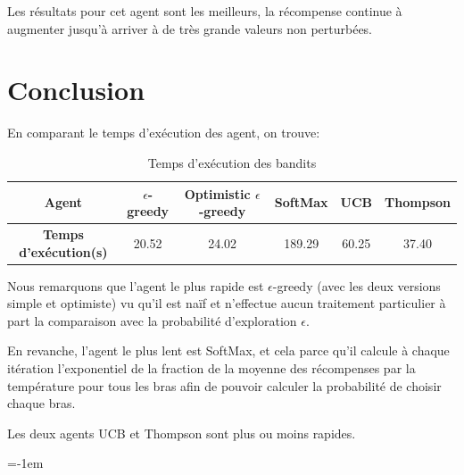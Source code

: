 \documentclass[a4paper,english,12pt]{article}
\makeatletter
\newcommand{\emptypage}[1]{
  \cleardoublepage
  \begingroup
  \let\ps@plain\ps@empty
  \pagestyle{empty}
  #1
  \cleardoublepage
  \endgroup}
\makeatother
\begin{document}
Les résultats pour cet agent sont les meilleurs, la récompense continue à augmenter jusqu'à arriver à de très grande valeurs non perturbées.

\section{Conclusion}
En comparant le temps d'exécution des agent, on trouve:

\begin{table}[H]\centering
	\begin{tabular}{cccccc}
		\toprule \textbf{Agent} & $\epsilon$-greedy & Optimistic $\epsilon$-greedy & SoftMax & UCB & Thompson\\    \midrule
		\textbf{Temps d'exécution(s)} & 20.52 & 24.02& 189.29 & 60.25 & 37.40  \\   
		\bottomrule	
	\end{tabular}
	\caption{Temps d'exécution des bandits}
\end{table}

Nous remarquons que l'agent le plus rapide est $\epsilon$-greedy (avec les deux versions simple et optimiste) vu qu'il est naïf et n'effectue aucun traitement particulier à part la comparaison avec la probabilité d'exploration $\epsilon$.

En revanche, l'agent le plus lent est SoftMax, et cela parce qu'il calcule à chaque itération l'exponentiel de la fraction de la moyenne des récompenses par la température pour tous les bras afin de pouvoir calculer la probabilité de choisir chaque bras.

Les deux agents UCB et Thompson sont plus ou moins rapides. 








\parskip=-1em
\let\section\oldsection %
%
\end{document}

